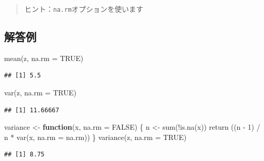 \documentclass[
  12pt,
]{book}
\newenvironment{Shaded}{\begin{snugshade}}{\end{snugshade}}
\newcommand{\AttributeTok}[1]{\textcolor[rgb]{0.77,0.63,0.00}{#1}}
\newcommand{\ConstantTok}[1]{\textcolor[rgb]{0.00,0.00,0.00}{#1}}
\newcommand{\ControlFlowTok}[1]{\textcolor[rgb]{0.13,0.29,0.53}{\textbf{#1}}}
\newcommand{\DecValTok}[1]{\textcolor[rgb]{0.00,0.00,0.81}{#1}}
\newcommand{\FunctionTok}[1]{\textcolor[rgb]{0.00,0.00,0.00}{#1}}
\newcommand{\NormalTok}[1]{#1}
\newcommand{\OtherTok}[1]{\textcolor[rgb]{0.56,0.35,0.01}{#1}}
\newcommand{\SpecialCharTok}[1]{\textcolor[rgb]{0.00,0.00,0.00}{#1}}
\begin{document}
\begin{quote}
ヒント：\texttt{na.rm}オプションを使います
\end{quote}

\hypertarget{ux89e3ux7b54ux4f8b-1}{%
\subsection*{解答例}\label{ux89e3ux7b54ux4f8b-1}}

\begin{Shaded}
\begin{Highlighting}[]
\FunctionTok{mean}\NormalTok{(z, }\AttributeTok{na.rm =} \ConstantTok{TRUE}\NormalTok{)}
\end{Highlighting}
\end{Shaded}

\begin{verbatim}
## [1] 5.5
\end{verbatim}

\begin{Shaded}
\begin{Highlighting}[]
\FunctionTok{var}\NormalTok{(z, }\AttributeTok{na.rm =} \ConstantTok{TRUE}\NormalTok{)}
\end{Highlighting}
\end{Shaded}

\begin{verbatim}
## [1] 11.66667
\end{verbatim}

\begin{Shaded}
\begin{Highlighting}[]
\NormalTok{variance }\OtherTok{\textless{}{-}} \ControlFlowTok{function}\NormalTok{(x, }\AttributeTok{na.rm =} \ConstantTok{FALSE}\NormalTok{) \{}
\NormalTok{  n }\OtherTok{\textless{}{-}} \FunctionTok{sum}\NormalTok{(}\SpecialCharTok{!}\FunctionTok{is.na}\NormalTok{(x))}
  \FunctionTok{return}\NormalTok{ ((n }\SpecialCharTok{{-}} \DecValTok{1}\NormalTok{) }\SpecialCharTok{/}\NormalTok{ n }\SpecialCharTok{*} \FunctionTok{var}\NormalTok{(x, }\AttributeTok{na.rm =}\NormalTok{ na.rm))}
\NormalTok{\}}
\FunctionTok{variance}\NormalTok{(z, }\AttributeTok{na.rm =} \ConstantTok{TRUE}\NormalTok{)}
\end{Highlighting}
\end{Shaded}

\begin{verbatim}
## [1] 8.75
\end{verbatim}
\end{document}
